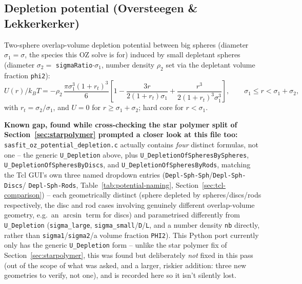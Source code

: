 \documentclass[11pt,a4paper]{article}
\newcommand{\code}[1]{\texttt{#1}}
\begin{document}
\subsection{Depletion potential (Oversteegen \& Lekkerkerker) \cite{oversteegen2004}}
\label{sec:depletion}
Two-sphere overlap-volume depletion potential between big spheres (diameter
$\sigma_1=\sigma$, the species this OZ solve is for) induced by small
depletant spheres (diameter $\sigma_2=$ \code{sigmaRatio}$\cdot\sigma_1$, number
density $\rho_2$ set via the depletant volume fraction \code{phi2}):
\begin{equation}
  U(r)/k_BT = -\rho_2\,\frac{\pi\sigma_1^3(1+r_t)^3}{6}
  \left[1-\frac{3r}{2(1+r_t)\sigma_1}+\frac{r^3}{2(1+r_t)^3\sigma_1^3}\right],
  \qquad \sigma_1\le r<\sigma_1+\sigma_2,
\end{equation}
with $r_t=\sigma_2/\sigma_1$, and $U=0$ for $r\ge\sigma_1+\sigma_2$; hard core
for $r<\sigma_1$.

\textbf{Known gap, found while cross-checking the star polymer split of
Section~\ref{sec:starpolymer} prompted a closer look at this file too:}
\code{sasfit\_oz\_potential\_depletion.c} actually contains \emph{four}
distinct formulas, not one -- the generic \code{U\_Depletion} above, plus
\code{U\_DepletionOfSpheresBySpheres}, \code{U\_DepletionOfSpheresByDiscs},
and \code{U\_DepletionOfSpheresByRods}, matching the Tcl GUI's own three
named dropdown entries (\code{Depl-Sph-Sph}/\code{Depl-Sph-Discs}/
\code{Depl-Sph-Rods}, Table~\ref{tab:potential-naming},
Section~\ref{sec:tcl-comparison}) -- each geometrically distinct (sphere
depleted by spheres/discs/rods respectively, the disc and rod cases
involving genuinely different overlap-volume geometry, e.g.\ an
$\arcsin$ term for discs) and parametrised differently from
\code{U\_Depletion} (\code{sigma\_large}, \code{sigma\_small}/\code{D}/\code{L},
and a number density \code{nb} directly, rather than
\code{sigma1}/\code{sigma2}/a volume fraction \code{PHI2}). This Python port
currently only has the generic \code{U\_Depletion} form -- unlike the star
polymer fix of Section~\ref{sec:starpolymer}, this was found but
deliberately \emph{not} fixed in this pass (out of the scope of what was
asked, and a larger, riskier addition: three new geometries to verify,
not one), and is recorded here so it isn't silently lost.
\end{document}
